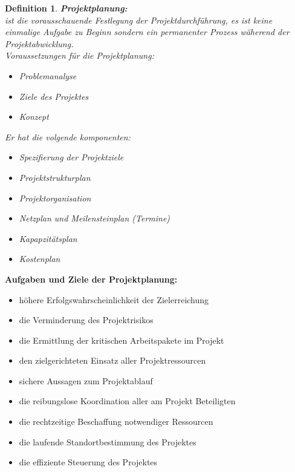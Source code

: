 \documentclass[11pt,a4paper]{article}
\newenvironment{de}[1]
{\begin{mdframed}[style=de]\begin{mydef}{\textbf{#1:}}\\} 
{\end{mydef}\end{mdframed}}
\newtheorem{mydef}{Definition}
\begin{document}
\begin{de}{Projektplanung}
ist die vorausschauende Festlegung der Projektdurchführung, es ist keine einmalige Aufgabe zu Beginn sondern ein permanenter Prozess wäherend der Projektabwicklung.\\
Voraussetzungen für die Projektplanung:
\begin{itemize}
\itemsep0em
\item Problemanalyse
\item Ziele des Projektes
\item Konzept
\end{itemize}

Er hat die volgende komponenten:
\begin{itemize}
\itemsep0em
\item Spezifierung der Projektziele
\item Projektstrukturplan
\item Projektorganisation
\item Netzplan und Meilensteinplan (Termine)
\item Kapapzitätsplan
\item Kostenplan
\end{itemize}
\end{de}
\noindent
\textbf{Aufgaben und Ziele der Projektplanung:}
\begin{itemize}

\item höhere Erfolgswahrscheinlichkeit der Zielerreichung
\item die Verminderung des Projektrisikos
\item die Ermittlung der kritischen Arbeitspakete im Projekt
\item den zielgerichteten Einsatz aller Projektressourcen
\item sichere Aussagen zum Projektablauf
\item die reibungslose Koordination aller am Projekt Beteiligten
\item die rechtzeitige Beschaffung notwendiger Ressourcen
\item die laufende Standortbestimmung des Projektes
\item die effiziente Steuerung des Projektes
\end{itemize}
\end{document}
